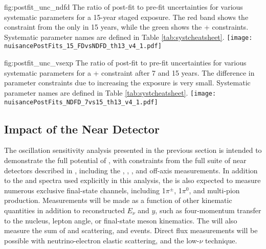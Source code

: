 \begin{dunefigure}{fig:postfit_unc_ndfd}
{The ratio of post-fit to pre-fit uncertainties for various systematic parameters for a 15-year staged exposure. The red band shows the constraint from the  only in 15 years, while the green shows the + constraints. Systematic parameter names are defined in Table \ref{tab:systcheatsheet}.}
  \texttt{[image: nuisancePostFits\_15\_FDvsNDFD\_th13\_v4\_1.pdf]}
\end{dunefigure}

\begin{dunefigure}{fig:postfit_unc_vsexp}
{The ratio of post-fit to pre-fit uncertainties for various systematic parameters for a + constraint after 7 and 15 years. The difference in parameter constraints due to increasing the exposure is very small. Systematic parameter names are defined in Table \ref{tab:systcheatsheet}.}
  \texttt{[image: nuisancePostFits\_NDFD\_7vs15\_th13\_v4\_1.pdf]}
\end{dunefigure}




\subsection{Impact of the Near Detector}
\label{sec:ndimpact}

The oscillation sensitivity analysis presented in the previous section is intended to demonstrate the full potential of , with constraints from the full suite of near detectors described in \introchnd, including the  , , , and off-axis measurements. In addition to the \numu and \anumu {} spectra used explicitly in this analysis, the   is also expected to measure numerous exclusive final-state  channels, including 1$\pi^{\pm}$, 1$\pi^0$, and multi-pion production. Measurements will be made as a function of other kinematic quantities in addition to reconstructed $E_{\nu}$ and $y$, such as four-momentum transfer to the nucleus, lepton angle, or final-state meson kinematics. The   will also measure the sum of \nue and \anue {} scattering, and  events. Direct flux measurements will be possible with neutrino-electron elastic scattering, and the low-$\nu$ technique.

